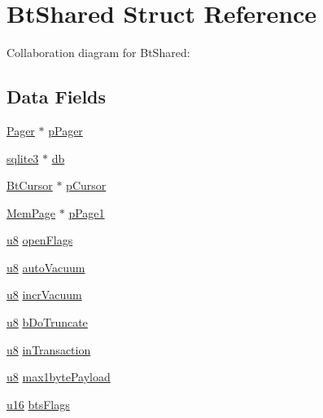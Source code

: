 \hypertarget{struct_bt_shared}{}\section{Bt\+Shared Struct Reference}
\label{struct_bt_shared}


Collaboration diagram for Bt\+Shared\+:
\subsection*{Data Fields}
\begin{DoxyCompactItemize}
\item 
\hyperlink{struct_pager}{Pager} $\ast$ \hyperlink{struct_bt_shared_a916447fa61ba4e11cc93d571a66d3aaf}{p\+Pager}
\item 
\hyperlink{structsqlite3}{sqlite3} $\ast$ \hyperlink{struct_bt_shared_ad6e663497d2c934364b3bcf07496b30b}{db}
\item 
\hyperlink{struct_bt_cursor}{Bt\+Cursor} $\ast$ \hyperlink{struct_bt_shared_a3719d9ea75c17cb66e4f628b8a4bd106}{p\+Cursor}
\item 
\hyperlink{struct_mem_page}{Mem\+Page} $\ast$ \hyperlink{struct_bt_shared_a7bec85d9a111476136787bc98741ef3c}{p\+Page1}
\item 
\hyperlink{sqlite3_8c_a74a0f6424ae628af25f23f0a35f6ead3}{u8} \hyperlink{struct_bt_shared_a886b174119e81e9f1b1988383017b7b9}{open\+Flags}
\item 
\hyperlink{sqlite3_8c_a74a0f6424ae628af25f23f0a35f6ead3}{u8} \hyperlink{struct_bt_shared_a46c2b8ffc42df0dba008a602dc2269a4}{auto\+Vacuum}
\item 
\hyperlink{sqlite3_8c_a74a0f6424ae628af25f23f0a35f6ead3}{u8} \hyperlink{struct_bt_shared_a04b3f93f1a63c4f95f0346725fa8054c}{incr\+Vacuum}
\item 
\hyperlink{sqlite3_8c_a74a0f6424ae628af25f23f0a35f6ead3}{u8} \hyperlink{struct_bt_shared_a0e2268e3b24b632d2e9a345ee9c319c9}{b\+Do\+Truncate}
\item 
\hyperlink{sqlite3_8c_a74a0f6424ae628af25f23f0a35f6ead3}{u8} \hyperlink{struct_bt_shared_ab3bcd3a6018a915020d48ef2f008f9a2}{in\+Transaction}
\item 
\hyperlink{sqlite3_8c_a74a0f6424ae628af25f23f0a35f6ead3}{u8} \hyperlink{struct_bt_shared_ae108776c319d9bbb89d5f8ededa5635b}{max1byte\+Payload}
\item 
\hyperlink{sqlite3_8c_a20f2299e322dcbde37cb07b16910b843}{u16} \hyperlink{struct_bt_shared_af9995be6d30d5d30d783b37074eab08e}{bts\+Flags}
\item 

\end{DoxyCompactItemize}
